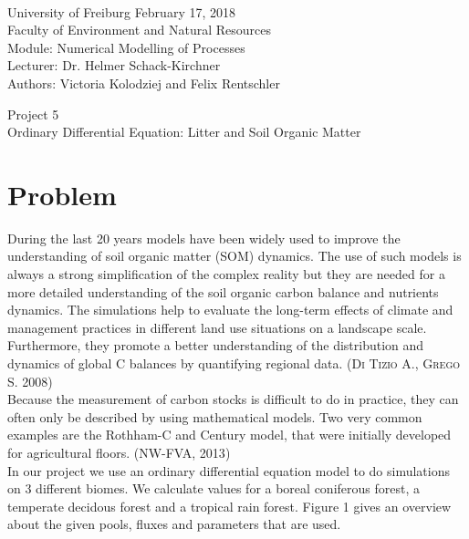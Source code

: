 \documentclass[10pt, a4paper]{article}
\begin{document}
\markboth{}
\\\noindent University of Freiburg \hspace{9cm}  February 17, 2018
\\Faculty of Environment and Natural Resources
\\Module: Numerical Modelling of Processes
\\Lecturer: Dr. Helmer Schack-Kirchner
\\Authors: Victoria Kolodziej and Felix Rentschler
\\

\begin{center}
	\huge{Project 5} \vspace{0.5cm}\\
	\Large {Ordinary Differential Equation: Litter and Soil Organic Matter}
\end{center}

\onehalfspacing %

\section{Problem}

During the last 20 years models have been widely used to improve the understanding of soil organic matter (SOM) dynamics. The use of such models is always a strong simplification of the complex reality but they are needed for a more detailed understanding of the soil organic carbon balance and nutrients dynamics. The simulations help to evaluate the long-term effects of climate and management practices in different land use situations on a landscape scale. Furthermore, they promote a better understanding of the distribution and dynamics of global C balances by quantifying regional data. (\textsc{Di Tizio A., Grego S. 2008})
\\
Because the measurement of carbon stocks is difficult to do in practice, they can often only be described by using mathematical models. Two very common examples are the Rothham-C and Century model, that were initially developed for agricultural floors. (\textsc{NW-FVA, 2013}) 
\\
In our project we use an ordinary differential equation model to do simulations on 3 different biomes. We calculate values for a boreal coniferous forest,  a temperate decidous forest and a tropical rain forest. 
Figure 1 gives an overview about the given pools, fluxes and parameters that are used. 
\end{document}
